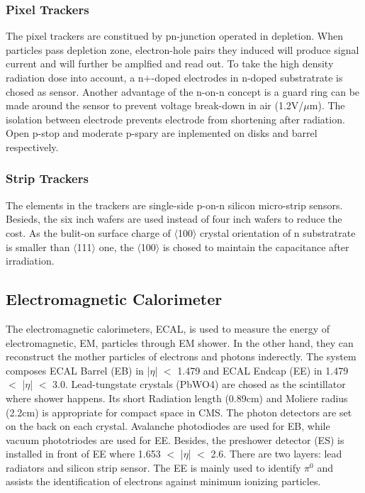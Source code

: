 \subsubsection{Pixel Trackers}
The pixel trackers are constitued by pn-junction operated in depletion. 
When particles pass depletion zone, electron-hole pairs they induced will produce signal current and will further be amplfied and read out. 
To take the high density radiation dose into account, a n$+$-doped electrodes in n-doped substratrate is chosed as sensor. 
Another advantage of the n-on-n concept is a guard ring can be made around the sensor to prevent voltage break-down in air (1.2V/$\mu $m). 
The isolation between electrode prevents electrode from shortening after radiation. Open p-stop and moderate p-spary are inplemented on disks and barrel respectively.

\subsubsection{Strip Trackers}
The elements in the trackers are single-side p-on-n silicon micro-strip sensors. 
Besieds, the six inch wafers are used instead of four inch wafers to reduce the cost. 
As the bulit-on surface charge of $\langle$100$\rangle$ crystal orientation of n substratrate is smaller than $\langle$111$\rangle$ one, 
the $\langle$100$\rangle$ is chosed to maintain the capacitance after irradiation.

\subsection{Electromagnetic Calorimeter} 
The electromagnetic calorimeters, ECAL, is used to measure the energy of electromagnetic, EM, particles through EM shower. 
In the other hand, they can reconstruct the mother particles of electrons and photons inderectly.
The system composes ECAL Barrel (EB) in |$\eta $| $<$ 1.479 and ECAL Endcap (EE) in 1.479 $<$ |$\eta $| $<$ 3.0. 
Lead-tungstate crystals (PbWO4) are chosed as the scintillator where shower happens.
Its short Radiation length (0.89cm) and Moliere radius (2.2cm) is appropriate for compact space in CMS.
The photon detectors are set on the back on each crystal. 
Avalanche photodiodes are used for EB, while vacuum phototriodes are used for EE. 
Besides, the preshower detector (ES) is installed in front of EE where 1.653 $<$ |$\eta $| $<$ 2.6. 
There are two layers: lead radiators and silicon strip sensor.
The EE is mainly used to identify $\pi ^0$ and assists the identification of electrons against minimum ionizing particles.
 

